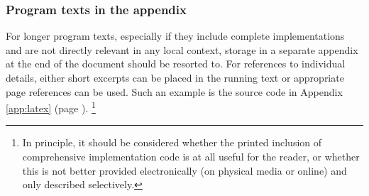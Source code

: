 \subsubsection{Program texts in the appendix}

For longer program texts, especially if they include complete implementations
and are not directly relevant in any local context, storage in a separate
appendix at the end of the document should be resorted to. For references to
individual details, either short excerpts can be placed in the running text
or appropriate page references can be used. Such an example is the \latex
source code in Appendix \ref{app:latex} (page \pageref{app:latex}).%
\footnote{In principle, it should be considered whether the printed inclusion
of comprehensive implementation code is at all useful for the reader, or
whether this is not better provided electronically (on physical media or
online) and only described selectively.}


